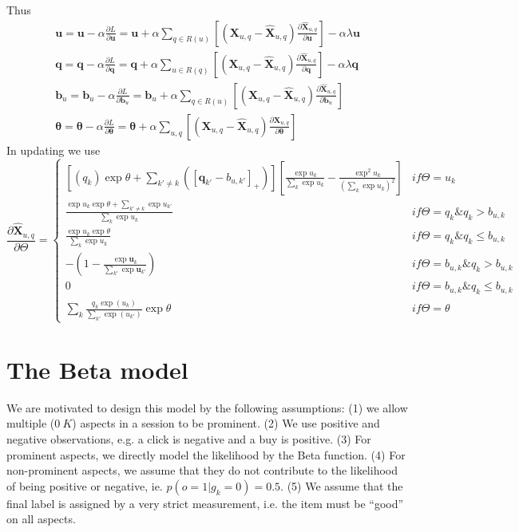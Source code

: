 \documentclass[11pt]{report}
\begin{document}
Thus \begin{eqnarray}
 \mathbf{u}= \mathbf{u} - \alpha \frac{\partial L}{\partial \mathbf{u}} =  \mathbf{u} +  \alpha \sum_{q\in R(u)}[ (\mathbf{X}_{u,q}- \hat{\mathbf{X}}_{u,q})\frac{\partial \hat{\mathbf{X}}_{u,q}}{\partial \mathbf{u}}] - \alpha\lambda \mathbf{u} \\\nonumber
 \mathbf{q} =  \mathbf{q} - \alpha \frac{\partial L}{\partial \mathbf{q}}=  \mathbf{q} +  \alpha \sum_{u\in R(q)}[ (\mathbf{X}_{u,q}- \hat{\mathbf{X}}_{u,q})\frac{\partial \hat{\mathbf{X}}_{u,q}}{\partial \mathbf{q}}] - \alpha\lambda \mathbf{q} \\\nonumber
 \mathbf{b}_{u} =  \mathbf{b}_{u} - \alpha \frac{\partial L}{\partial \mathbf{b}_{u}}=  \mathbf{b}_{u} +  \alpha \sum_{q\in R(u)}[ (\mathbf{X}_{u,q}- \hat{\mathbf{X}}_{u,q})\frac{\partial \hat{\mathbf{X}}_{u,q}}{\partial \mathbf{b}_u}]  \\\nonumber
\mathbf{\theta} =  \mathbf{\theta} - \alpha \frac{\partial L}{\partial \mathbf{\theta}}=  \mathbf{\theta} +  \alpha \sum_{u,q}[ (\mathbf{X}_{u,q}- \hat{\mathbf{X}}_{u,q})\frac{\partial \hat{\mathbf{X}}_{u,q}}{\partial \mathbf{\theta}}] 
\end{eqnarray}
In updating we use
 \begin{equation}\label{equ:derivative}
 \frac{\partial \hat{\mathbf{X}}_{u,q}}{\partial \Theta}=\left\{\begin{matrix}
 [(q_k) \exp\theta +\sum_{k'\neq k}([\mathbf{q}_{k'}-b_{u,k'}]_+)][\frac{\exp u_k}{\sum_{k}\exp u_k}-\frac{\exp^2 u_k}{(\sum_k \exp u_k)^2}] & if \Theta=u_k \\ 
\frac{\exp u_k \exp \theta +\sum_{k'\neq k} \exp u_{k'}}{\sum_k \exp u_k}  & if \Theta= q_{k} \& q_{k} > b_{u,k} \\ 
\frac{\exp u_k \exp \theta }{\sum_k \exp u_k}  & if \Theta= q_{k} \& q_{k} \leq b_{u,k} \\ 
-(1-\frac{\exp\mathbf{u}_k}{\sum_{k'}\exp\mathbf{u}_{k'}}) & if \Theta = b_{u,k} \& q_k > b_{u,k} \\
0 & if \Theta = b_{u,k} \& q_k \leq b_{u,k} \\
\sum_k  \frac{q_k \exp (u_k)}{\sum_{k'} \exp (u_{k'})} \exp \theta & if \Theta = \theta 
\end{matrix}\right.
\end{equation}

\section{The Beta model}
 We are motivated to design this model by the following assumptions: (1) we allow  multiple ($0~K$) aspects in a session to be prominent. (2) We use positive and negative observations, e.g. a click is negative and a buy is positive. (3) For prominent aspects, we directly model the likelihood by the Beta function. (4) For non-prominent aspects, we assume that they do not contribute to the likelihood of being positive or negative, ie. $p(o=1|g_k=0)=0.5$.  (5) We assume that the final label is assigned by a very strict measurement, i.e. the item must be ``good'' on all aspects.
 
\end{document}
